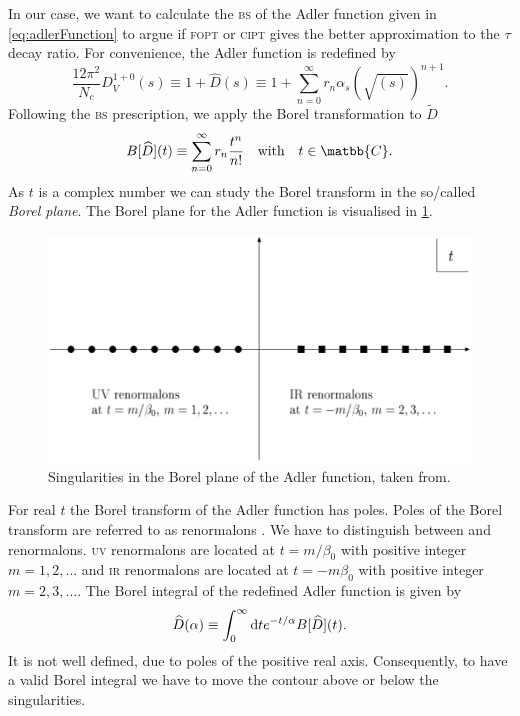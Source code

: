 \documentclass[../../index.tex]{subfiles}
\begin{document}
In our case, we want to calculate the \textsc{bs} of the Adler function given in
\cref{eq:adlerFunction} to argue if \textsc{fopt} or \textsc{cipt} gives the
better approximation to the \(\tau\) decay ratio. For convenience, the Adler
function is redefined by
\begin{equation}
  \frac{12 \pi^2}{N_c} D_V^{1+0}(s) \equiv 1 + \widehat D(s) \equiv 1 + \sum_{n=0}^{\infty} r_n \alpha_s(\sqrt{(s)})^{n+1}.
\end{equation}
Following the \textsc{bs} prescription, we apply the Borel transformation to
\(\widetilde D\)
\begin{equation}
  B[\widehat D](t) \equiv \sum_{n=0}^{\infty} r_n \frac{t^n}{n!} \quad \text{with} \quad t \in \matbb{C}.
\end{equation}
As \(t\) is a complex number we can study the Borel transform in the so\-/called
\textit{Borel plane}. The Borel plane for the Adler function is visualised in
\cref{fig:borelPlane}.
\begin{figure}
  \centering \includegraphics[width=\textwidth]{./images/borelPlane.eps}
  \caption{Singularities in the Borel plane of the Adler function, taken
    from\cite{Beneke1998}.}
  \label{fig:borelPlane}
\end{figure}
For real \(t\) the Borel transform of the Adler function has poles. Poles of the
Borel transform are referred to as renormalons \cite{Beneke1999, Zichichi1979}.
We have to distinguish between  and
 renormalons. \textsc{uv} renormalons are located at
\(t=m/\beta_0\) with positive integer \(m=1,2,\dots\) and \textsc{ir}
renormalons are located at \(t=-m\beta_0\) with positive integer
\(m=2,3,\dots\). The Borel integral of the redefined Adler function is given by
\begin{equation}
  \widehat D(\alpha) \equiv \int_0^\infty \dif t e^{-t/\alpha} B[\widehat D](t).
\end{equation} 
It is not well defined, due to poles of the positive real axis. Consequently, to
have a valid Borel integral we have to move the contour above or below the
singularities.
\end{document}
